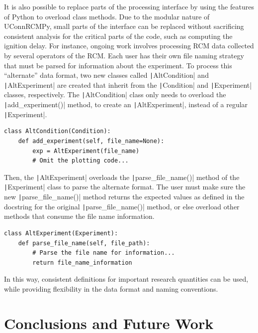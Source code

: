 \documentclass[12pt]{../ussci}
\begin{document}
It is also possible to replace parts of the processing interface by
using the features of Python to overload class methods. Due to the
modular nature of UConnRCMPy, small parts of the interface can be
replaced without sacrificing consistent analysis for the critical parts
of the code, such as computing the ignition delay. For instance, ongoing
work involves processing RCM data collected by several operators of the
RCM. Each user has their own file naming strategy that must be parsed
for information about the experiment. To process this ``alternate'' data
format, two new classes called \texttt|AltCondition| and
\texttt|AltExperiment| are created that inherit from the
\texttt|Condition| and \texttt|Experiment| classes, respectively. The
\texttt|AltCondition| class only needs to overload the
\texttt|add\_experiment()| method, to create an \texttt|AltExperiment|,
instead of a regular \texttt|Experiment|.

\begin{verbatim}
class AltCondition(Condition):
    def add_experiment(self, file_name=None):
        exp = AltExperiment(file_name)
        # Omit the plotting code...
\end{verbatim}

Then, the \texttt|AltExperiment| overloads the
\texttt|parse_file_name()| method of the \texttt|Experiment| class to
parse the alternate format. The user must make sure the new
\texttt|parse_file_name()| method returns the expected values as
defined in the docstring for the original \texttt|parse_file_name()|
method, or else overload other methods that consume the file name
information.

\begin{verbatim}
class AltExperiment(Experiment):
    def parse_file_name(self, file_path):
        # Parse the file name for information...
        return file_name_information
\end{verbatim}

In this way, consistent definitions for important research quantities
can be used, while providing flexibility in the data format and naming
conventions.

\section{Conclusions and Future Work}\label{conclusions-and-future-work}
\end{document}
